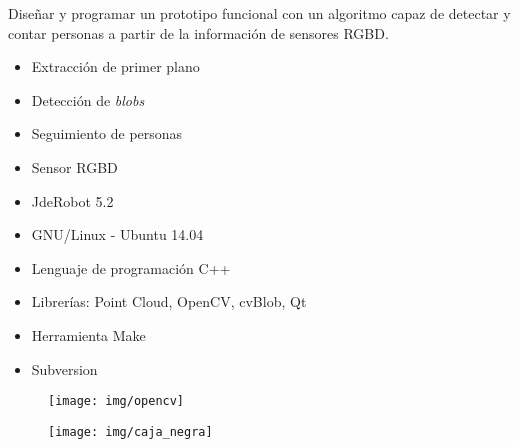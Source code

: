 \documentclass[notes,slidesec,a4]{seminar}
\begin{document}

\begin{hslide}
Diseñar y programar un prototipo funcional con un algoritmo capaz de detectar y contar personas a partir de la información de sensores RGBD.
\begin{itemize}
\item Extracción de primer plano
\item Detección de \textit{blobs}
\item Seguimiento de personas
\end{itemize}
\end{hslide}


\begin{hslide}
\begin{minipage}{6cm}
\begin{center}
\begin{itemize}
\item Sensor RGBD
\item JdeRobot 5.2
\item GNU/Linux - Ubuntu 14.04
\item Lenguaje de programación C++
\item Librerías: Point Cloud, OpenCV, cvBlob, Qt
\item Herramienta Make
\item Subversion
\end{itemize}
\end{center}
\end{minipage} \hfill
\begin{minipage}{5cm}
\begin{center}
\begin{figure}
\texttt{[image: img/opencv]}
\end{figure}
\end{center}
\end{minipage}
\end{hslide}


\begin{hslide}
\begin{center}
\begin{figure}
\texttt{[image: img/caja\_negra]}
\end{figure}
\end{center}
\end{hslide}
\end{document}
